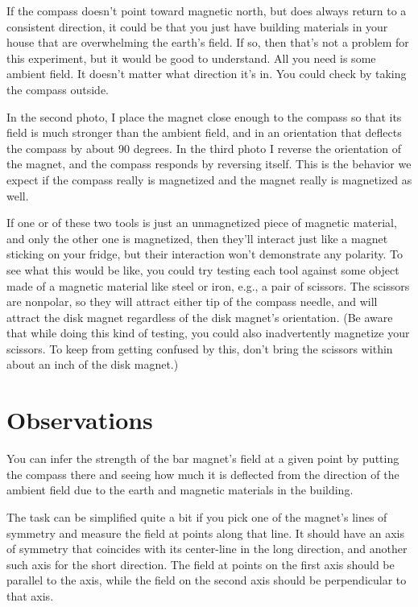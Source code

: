If the compass doesn't point toward magnetic north, but does always return to a consistent
direction, it could be that you just have building materials in your house that are
overwhelming the earth's field. If so, then that's not a problem for this experiment,
but it would be good to understand. All you need is some ambient field. It doesn't matter
what direction it's in. You could check by taking the compass outside.

In the second photo, I place the magnet close enough to the compass so that its field
is much stronger than the ambient field, and in an orientation that deflects the compass
by about 90 degrees. In the third photo I reverse the orientation of the magnet, and the
compass responds by reversing itself. This is the behavior we expect if the compass really is magnetized
and the magnet really is magnetized as well.

If one or of these two tools is just
an unmagnetized piece of magnetic material, and only the other one is magnetized, then they'll
interact just like a magnet sticking on your fridge, but their interaction won't demonstrate any
polarity. To see what this would be like, you could try testing each tool against
some object made of a magnetic material like steel or iron, e.g., a pair of scissors.
The scissors are nonpolar, so they will attract either tip of the compass needle,
and will attract the disk magnet regardless of the disk magnet's orientation.
(Be aware that while doing this kind of testing, you could also inadvertently magnetize
your scissors. To keep from getting confused by this, don't bring the scissors within
about an inch of the disk magnet.)

\section*{Observations}

You can infer the strength of the bar magnet's field at a
given point by putting the compass there and seeing how
much it is deflected from the direction of the ambient
field due to the earth and magnetic materials in the building.

The task can be simplified quite a bit if you pick one of the
magnet's lines of symmetry and measure the field at points
along that line. It should have
an axis of symmetry that coincides with its center-line
in the long direction, and another such axis for the short direction.
The field at points on the first axis should be parallel to the axis,
while the field on the second axis should be perpendicular to that axis.

